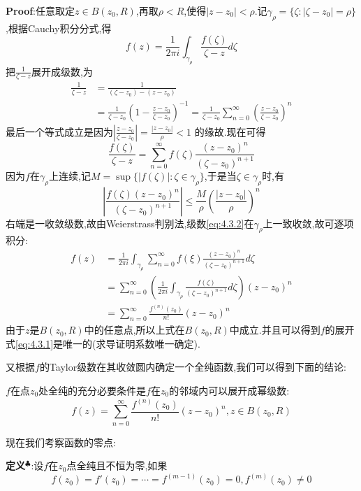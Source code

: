 \textbf{Proof}:任意取定$z\in B(z_0,R)$,再取$\rho <R$,使得$|z-z_0|<\rho$.记$\gamma_\rho =\{\zeta:|\zeta-z_0|=\rho\}$,根据Cauchy积分分式,得
$$
f(z)=\frac{1}{2\pi i}\int_{\gamma_\rho} \frac{f(\zeta)}{\zeta - z}d\zeta
$$
把$\frac{1}{\zeta - z}$展开成级数,为
$$
\begin{aligned}
    \frac{1}{\zeta - z} &= \frac{1}{(\zeta - z_0) - (z - z_0)} \\
                        &= \frac{1}{\zeta - z_0}\left(1 - \frac{z - z_0}{\zeta - z_0} \right)^{-1} = \frac{1}{\zeta - z_0} \sum_{n=0}^{\infty} \left( \frac{z - z_0}{\zeta - z_0} \right)^n
\end{aligned}
$$
最后一个等式成立是因为$\left|\frac{z - z_0}{\zeta - z_0}\right|=\frac{|z - z_0|}{\rho} < 1$ 的缘故.现在可得
\begin{equation}
    \frac{f(\zeta)}{\zeta - z} = \sum_{n=0}^{\infty} f(\zeta)\frac{(z - z_0)^n}{(\zeta - z_0)^{n+1}} \label{eq:4.3.2}
\end{equation}
因为$f$在$\gamma_\rho$上连续,记$M=\sup\{|f(\zeta)|:\zeta\in \gamma_\rho\}$,于是当$\zeta \in \gamma_\rho$时,有
$$
\left|\frac{f(\zeta)(z - z_0)^n}{(\zeta - z_0)^{n+1}}\right| \leqslant \frac{M}{\rho}\left(\frac{|z - z_0|}{\rho}\right)^n
$$
右端是一收敛级数,故由Weierstrass判别法,级数\eqref{eq:4.3.2}在$\gamma_\rho$上一致收敛,故可逐项积分:
$$
\begin{aligned}
    f(z) &= \frac{1}{2\pi i}\int_{\gamma_\rho} \sum_{n=0}^{\infty} f(\xi)\frac{(z - z_0)^n}{(\zeta - z_0)^{n+1}}d\zeta\\
         &= \sum_{n=0}^{\infty} \left( \frac{1}{2\pi i}\int_{\gamma_\rho} \frac{f(\zeta)}{(\zeta - z_0)^{n+1}}d\zeta\right)(z - z_0)^n\\
         &= \sum_{n=0}^{\infty}\frac{f^{(n)}(z_0)}{n!}(z-z_0)^n
\end{aligned}
$$
由于$z$是$B(z_0,R)$中的任意点,所以上式在$B(z_0,R)$中成立.并且可以得到$f$的展开式\eqref{eq:4.3.1}是唯一的(求导证明系数唯一确定).\par
又根据$f$的Taylor级数在其收敛圆内确定一个全纯函数,我们可以得到下面的结论:
\begin{tcolorbox}[colback=KuangNei,colframe=BianKuang,title=\textbf{全纯函数的Taylor展开},sharpish corners]
$f$在点$z_0$处全纯的充分必要条件是$f$在$z_0$的邻域内可以展开成幂级数:
$$   
f(z)=\sum_{n=0}^{\infty}\frac{f^{(n)}(z_0)}{n!}(z-z_0)^n, z\in B(z_0,R) 
$$
\end{tcolorbox}
现在我们考察函数的零点:\par
\textbf{定义}$^\clubsuit$:设$f$在$z_0$点全纯且不恒为零,如果
$$
f(z_0)=f'(z_0)=\cdots=f^{(m-1)}(z_0)=0,f^{(m)}(z_0)\neq 0
$$
